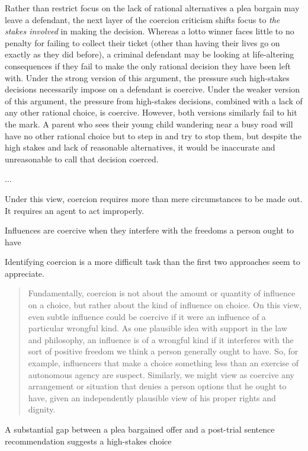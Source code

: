 Rather than restrict focus on the lack of rational alternatives a plea bargain may leave a defendant, the next layer of the coercion criticism shifts focus to \textit{the stakes involved} in making the decision. Whereas a lotto winner faces little to no penalty for failing to collect their ticket (other than having their lives go on exactly as they did before), a criminal defendant may be looking at life-altering consequences if they fail to make the only rational decision they have been left with. Under the strong version of this argument, the pressure such high-stakes decisions necessarily impose on a defendant is coercive. Under the weaker version of this argument, the pressure from high-stakes decisions, combined with a lack of any other rational choice, is coercive. However, both versions similarly fail to hit the mark. A parent who sees their young child wandering near a busy road will have no other rational choice but to step in and try to stop them, but despite the high stakes and lack of reasonable alternatives, it would be inaccurate and unreasonable to call that decision coerced. 

... 

Under this view, coercion requires more than mere circumstances to be made out. It requires an agent to act improperly. 

Influences are coercive when they interfere with the freedoms a person ought to have

Identifying coercion is a more difficult task than the first two approaches seem to appreciate.
\begin{quote}
    Fundamentally, coercion is not about the amount or quantity of influence on a choice, but rather about the kind of influence on \textbf{}choice. On this view, even subtle influence could be coercive if it were an influence of a particular wrongful kind. As one plausible idea with support in the law and philosophy, an influence is of a wrongful kind if it interferes with the sort of positive freedom we think a person generally ought to have. So, for example, influencers that make a choice something less than an exercise of autonomous agency are suspect. Similarly, we might view as coercive any arrangement or situation that denies a person options that he ought to have, given an independently plausible view of his proper rights and dignity.
\end{quote}

A substantial gap between a plea bargained offer and a post-trial sentence recommendation suggests a high-stakes choice

